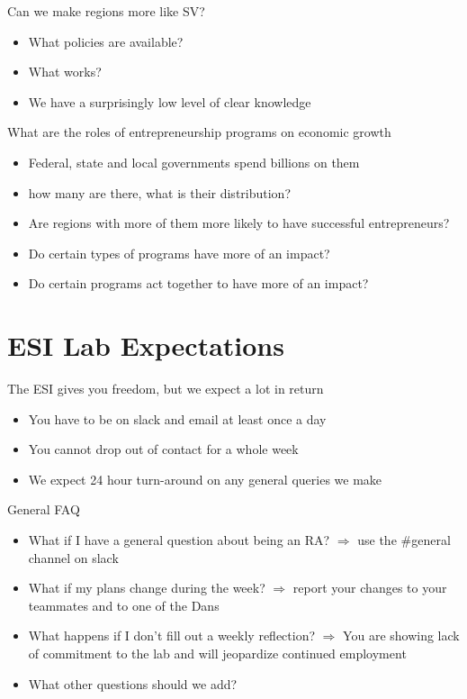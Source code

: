 \documentclass{beamer}
\begin{document}
\begin{frame}{Can we make regions more like SV?}
  \begin{itemize}
      \item{What policies are available?}
      \item{What works?}
      \item{We have a surprisingly low level of clear knowledge}
  \end{itemize}
\end{frame}

\begin{frame}{What are the roles of entrepreneurship programs on economic growth}
\begin{itemize}
    \item{Federal, state and local governments spend billions on them}
    \item{how many are there, what is their distribution?}
    \item{Are regions with more of them more likely to have successful entrepreneurs?}
    \item{Do certain types of programs have more of an impact?}
    \item{Do certain programs act together to have more of an impact?}
\end{itemize}
  
\end{frame}


\section{ESI Lab Expectations}

\begin{frame}{The ESI gives you freedom, but we expect a lot in return}
  \begin{itemize}
      \item{You have to be on slack and email at least once a day}
      \item{You cannot drop out of contact for a whole week}
      \item{We expect 24 hour turn-around on any general queries we make}
  \end{itemize}
\end{frame}

\begin{frame}{General FAQ}
  \begin{itemize}
      \item{What if I have a general question about being an RA? $\Rightarrow$ use the \#general channel on slack}
      \item{What if my plans change during the week? $\Rightarrow$ report your changes to your teammates and to one of the Dans}
      \item{What happens if I don't fill out a weekly reflection? $\Rightarrow$ You are showing lack of commitment to the lab and will jeopardize continued employment}
      \item{What other questions should we add?}
  \end{itemize}
\end{frame}
\end{document}
